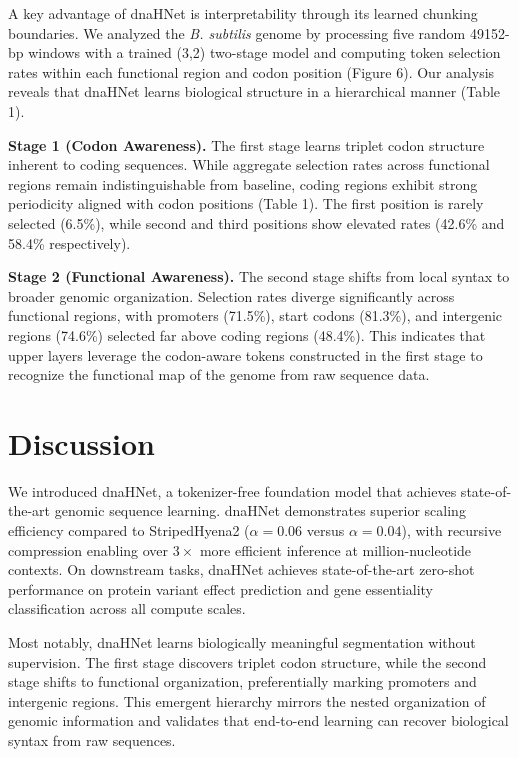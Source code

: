 \documentclass{article}
\theoremstyle{plain}
\theoremstyle{definition}
\theoremstyle{remark}
\begin{document}
A key advantage of dnaHNet is interpretability through its learned chunking boundaries. We analyzed the \textit{B. subtilis} genome by processing five random 49152-bp windows with a trained (3,2) two-stage model and computing token selection rates within each functional region and codon position (Figure 6). Our analysis reveals that dnaHNet learns biological structure in a hierarchical manner (Table 1).

\textbf{Stage 1 (Codon Awareness).} The first stage learns triplet codon structure inherent to coding sequences. While aggregate selection rates across functional regions remain indistinguishable from baseline, coding regions exhibit strong periodicity aligned with codon positions (Table 1). The first position is rarely selected (6.5\%), while second and third positions show elevated rates (42.6\% and 58.4\% respectively).

\textbf{Stage 2 (Functional Awareness).} The second stage shifts from local syntax to broader genomic organization. Selection rates diverge significantly across functional regions, with promoters (71.5\%), start codons (81.3\%), and intergenic regions (74.6\%) selected far above coding regions (48.4\%). This indicates that upper layers leverage the codon-aware tokens constructed in the first stage to recognize the functional map of the genome from raw sequence data.

\section{Discussion}

We introduced dnaHNet, a tokenizer-free foundation model that achieves state-of-the-art genomic sequence learning. dnaHNet demonstrates superior scaling efficiency compared to StripedHyena2 ($\alpha = 0.06$ versus $\alpha = 0.04$), with recursive compression enabling over $3\times$ more efficient inference at million-nucleotide contexts. On downstream tasks, dnaHNet achieves state-of-the-art zero-shot performance on protein variant effect prediction and gene essentiality classification across all compute scales.

Most notably, dnaHNet learns biologically meaningful segmentation without supervision. The first stage discovers triplet codon structure, while the second stage shifts to functional organization, preferentially marking promoters and intergenic regions. This emergent hierarchy mirrors the nested organization of genomic information and validates that end-to-end learning can recover biological syntax from raw sequences.
\end{document}
